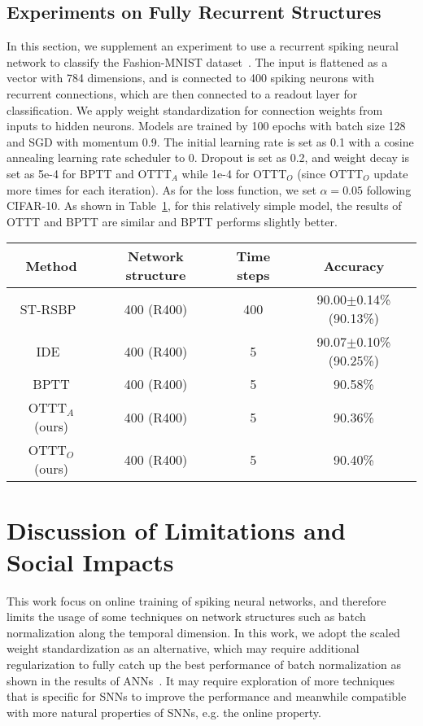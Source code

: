 \documentclass{article}
\begin{document}
\subsection{Experiments on Fully Recurrent Structures}

In this section, we supplement an experiment to use a recurrent spiking neural network to classify the Fashion-MNIST dataset~\cite{xiao2017fashion}. The input is flattened as a vector with 784 dimensions, and is connected to 400 spiking neurons with recurrent connections, which are then connected to a readout layer for classification. We apply weight standardization for connection weights from inputs to hidden neurons. Models are trained by 100 epochs with batch size 128 and SGD with momentum 0.9. The initial learning rate is set as 0.1 with a cosine annealing learning rate scheduler to 0. Dropout is set as 0.2, and weight decay is set as 5e-4 for BPTT and OTTT$_A$ while 1e-4 for OTTT$_O$ (since OTTT$_O$ update more times for each iteration). As for the loss function, we set $\alpha=0.05$ following CIFAR-10. As shown in Table~\ref{fashionmnist}, for this relatively simple model, the results of OTTT and BPTT are similar and BPTT performs slightly better.

\begin{table} [ht]
	\centering
	\small
	\tabcolsep=0.5mm
	\begin{tabular}{cccc}
		\toprule[1pt]
		Method & Network structure & Time steps & Accuracy\\
		\midrule[0.5pt]
		ST-RSBP~\cite{zhang2019spike} & 400 (R400) & 400 & 90.00$\pm$0.14\% (90.13\%)\\
		IDE~\cite{xiao2021training} & 400 (R400) & 5 & 90.07$\pm$0.10\% (90.25\%) \\
		\hline
		BPTT & 400 (R400) & 5 & 90.58\% \\
		OTTT$_A$ (ours) & 400 (R400) & 5 & 90.36\%\\
		OTTT$_O$ (ours) & 400 (R400) & 5 & 90.40\%\\
		\bottomrule[1pt]
	\end{tabular}
	\label{fashionmnist}
\end{table}


\section{Discussion of Limitations and Social Impacts}

This work focus on online training of spiking neural networks, and therefore limits the usage of some techniques on network structures such as batch normalization along the temporal dimension. In this work, we adopt the scaled weight standardization as an alternative, which may require additional regularization to fully catch up the best performance of batch normalization as shown in the results of ANNs~\cite{brock2021characterizing}. It may require exploration of more techniques that is specific for SNNs to improve the performance and meanwhile compatible with more natural properties of SNNs, e.g. the online property.
\end{document}
